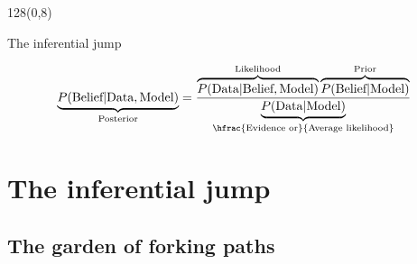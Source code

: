 \documentclass[shownotes]{beamer}
\begin{document}
\begin{frame}
\begin{textblock}{128}(0,8)
\begin{center}
 \Large The inferential jump
\end{center}
\end{textblock}
\vspace{0.9cm}

 \pause 

 \vspace{0.6cm}
 
 \begin{equation}
  \underbrace{P(\text{Belief}|\text{Data},\text{Model})}_{\text{\scriptsize Posterior}} = \frac{\overbrace{P(\text{Data}|\text{Belief},\text{Model})}^{\text{\scriptsize Likelihood}} \overbrace{P(\text{Belief}|\text{Model})}^{\text{\scriptsize Prior}} }{\underbrace{P(\text{Data}|\text{Model})}_{\hfrac{\text{\scriptsize Evidence or}}{\text{\scriptsize Average likelihood}}}}
 \end{equation}

 \pause \vspace{0.5cm}
 
 
 
\end{frame}

\section{The inferential jump}

\subsection{The garden of forking paths}
\end{document}
